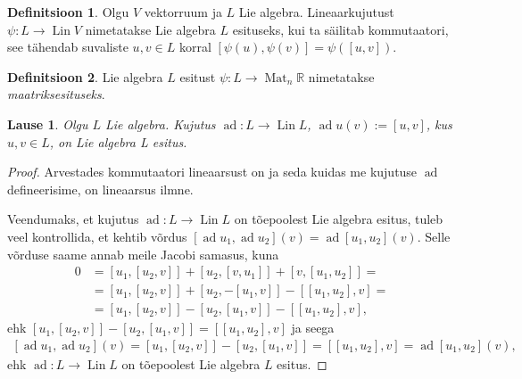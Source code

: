 \documentclass[a4paper,12pt]{article}
\theoremstyle{plain}
\newtheorem{lause}{Lause}[section]
\theoremstyle{definition}
\newtheorem{definitsioon}{Definitsioon}[section]
\numberwithin{equation}{section}
\def\R{{\mathbb R}}
\DeclareMathOperator{\Mat}{Mat}
\DeclareMathOperator{\ad}{ad}
\DeclareMathOperator{\Lin}{Lin}
\begin{document}
\begin{definitsioon}
Olgu $V$ vektorruum ja $L$ Lie algebra. Lineaarkujutust $\psi : L \rightarrow \Lin V$ nimetatakse Lie algebra $L$ esituseks, kui ta säilitab kommutaatori, see tähendab suvaliste $u, v \in L$ korral $\left[\psi\left(u\right), \psi\left(v\right)\right] = \psi\left(\left[u, v\right]\right)$. 
\end{definitsioon}

\begin{definitsioon}
Lie algebra $L$ esitust $\psi : L \rightarrow \Mat_n \R$ nimetatakse \emph{maatriksesituseks}.
\end{definitsioon}

\begin{lause} \label{lause:adjoint}
Olgu $L$ Lie algebra. Kujutus $\ad : L \rightarrow \Lin L$, $\ad u \left(v\right) := \left[u, v\right]$, kus $u,v \in L$, on Lie algebra L esitus.
\end{lause}

\begin{proof}
Arvestades kommutaatori lineaarsust on ja seda kuidas me kujutuse $\ad$ defineerisime, on lineaarsus ilmne.

Veendumaks, et kujutus $\ad : L \rightarrow \Lin L$ on tõepoolest Lie algebra esitus, tuleb veel kontrollida, et kehtib võrdus $\left[\ad u_1, \ad u_2 \right] \left(v\right) = \ad \left[u_1, u_2 \right] \left(v\right)$. Selle võrduse saame annab meile Jacobi samasus, kuna
\begin{align*}
0 &= \left[ u_1, \left[u_2, v\right] \right] + \left[ u_2, \left[v, u_1 \right] \right] + \left[ v, \left[u_1, u_2\right] \right] = \\
&= \left[ u_1, \left[u_2, v\right] \right] + \left[ u_2, -\left[u_1, v \right] \right] - \left[\left[u_1, u_2\right], v\right] = \\
&= \left[ u_1, \left[u_2, v\right] \right] - \left[ u_2, \left[u_1, v \right] \right] - \left[\left[u_1, u_2\right], v\right],
\end{align*}
ehk $\left[ u_1, \left[u_2, v\right] \right] - \left[ u_2, \left[u_1, v \right] \right] = \left[\left[u_1, u_2\right], v\right]$ ja seega
\begin{align*}
\left[\ad u_1, \ad u_2 \right] \left(v\right) = \left[u_1, \left[u_2, v\right]\right ] - \left[u_2, \left[u_1, v\right]\right] = \left[\left[u_1, u_2\right], v\right] = 
\ad \left[u_1, u_2 \right] \left(v\right),
\end{align*}
ehk $\ad : L \rightarrow \Lin L$ on tõepoolest Lie algebra $L$ esitus.
\end{proof}
\end{document}
